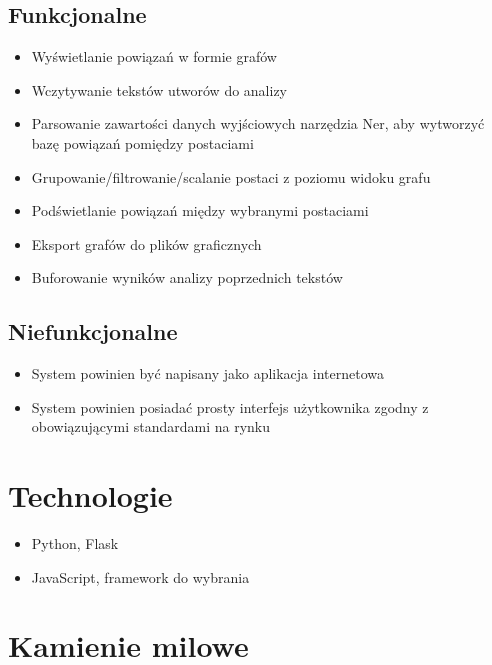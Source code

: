 \documentclass[12pt,a4paper]{article} %
\begin{document}
    \subsection{Funkcjonalne}
        \begin{itemize}
            \item Wyświetlanie powiązań w formie grafów
            \item Wczytywanie tekstów utworów do analizy
            \item Parsowanie zawartości danych wyjściowych narzędzia Ner, aby wytworzyć bazę powiązań pomiędzy postaciami
            \item Grupowanie/filtrowanie/scalanie postaci z poziomu widoku grafu
            \item Podświetlanie powiązań między wybranymi postaciami
            \item Eksport grafów do plików graficznych
            \item Buforowanie wyników analizy poprzednich tekstów
        \end{itemize}

    \subsection{Niefunkcjonalne}
        \begin{itemize}
            \item System powinien być napisany jako aplikacja internetowa
            \item System powinien posiadać prosty interfejs użytkownika zgodny z obowiązującymi standardami na rynku
        \end{itemize}


\section{Technologie}
    \begin{itemize}
        \item Python, Flask
        \item JavaScript, framework do wybrania
    \end{itemize}

\section{Kamienie milowe}
\end{document}
